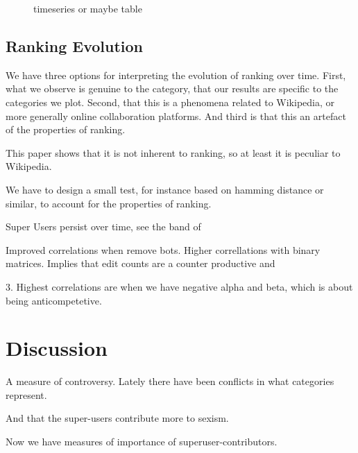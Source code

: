 \documentclass{acm_proc_article-sp}
\begin{document}
\begin{figure}[!t]
\centering
\caption{timeseries or maybe table}
\label{timeseries or maybe table}
\end{figure}

\subsection{Ranking Evolution}
We have three options for interpreting the evolution of ranking over time. First, what we observe is genuine to the category, that our results are specific to the categories we plot. Second, that this is a phenomena related to Wikipedia, or more generally online collaboration platforms. And third is that this an artefact of the properties of ranking. 

This paper \cite{bloom} shows that it is not inherent to ranking, so at least it is peculiar to Wikipedia. 

We have to design a small test, for instance based on hamming distance or similar, to account for the properties of ranking. 


Super Users persist over time, see the band of 




Improved correlations when remove bots. Higher correllations with binary matrices. 
Implies that edit counts are a counter productive and 


3. Highest correlations are when we have negative alpha and beta, which is about being anticompetetive. 




\section{Discussion}

A measure of controversy. Lately there have been conflicts in what categories represent.  \cite{website:nyt}

And that the super-users contribute more to sexism.\cite{website:wikinewsreporter}

 Now we have measures of importance of superuser-contributors. 
\end{document}
